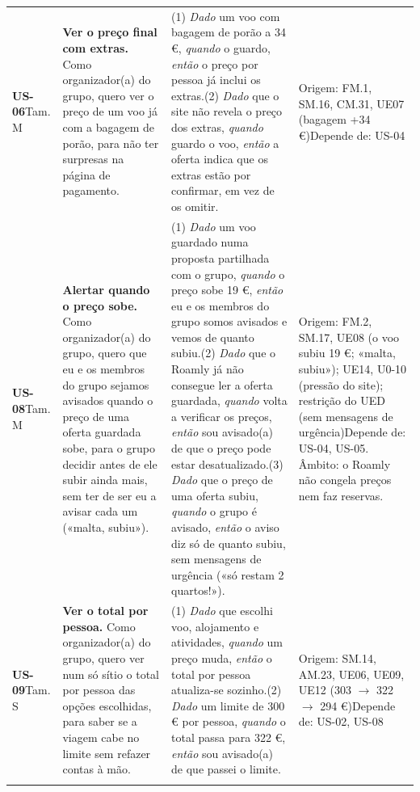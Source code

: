 {\begin{longtable}{@{}p{1.5cm}p{5.1cm}p{5.2cm}p{3.6cm}@{}}
\textbf{US-06}\newline Tam. M & \textbf{Ver o preço final com extras.} Como organizador(a) do grupo, quero ver o preço de um voo já com a bagagem de porão, para não ter surpresas na página de pagamento. & (1) \textit{Dado} um voo com bagagem de porão a 34 €, \textit{quando} o guardo, \textit{então} o preço por pessoa já inclui os extras.\newline (2) \textit{Dado} que o site não revela o preço dos extras, \textit{quando} guardo o voo, \textit{então} a oferta indica que os extras estão por confirmar, em vez de os omitir. & Origem: FM.1, SM.16, CM.31, UE07 (bagagem +34 €)\newline Depende de: US-04 \\ \addlinespace
\textbf{US-08}\newline Tam. M & \textbf{Alertar quando o preço sobe.} Como organizador(a) do grupo, quero que eu e os membros do grupo sejamos avisados quando o preço de uma oferta guardada sobe, para o grupo decidir antes de ele subir ainda mais, sem ter de ser eu a avisar cada um («malta, subiu»). & (1) \textit{Dado} um voo guardado numa proposta partilhada com o grupo, \textit{quando} o preço sobe 19 €, \textit{então} eu e os membros do grupo somos avisados e vemos de quanto subiu.\newline (2) \textit{Dado} que o Roamly já não consegue ler a oferta guardada, \textit{quando} volta a verificar os preços, \textit{então} sou avisado(a) de que o preço pode estar desatualizado.\newline (3) \textit{Dado} que o preço de uma oferta subiu, \textit{quando} o grupo é avisado, \textit{então} o aviso diz só de quanto subiu, sem mensagens de urgência («só restam 2 quartos!»). & Origem: FM.2, SM.17, UE08 (o voo subiu 19 €; «malta, subiu»); UE14, U0-10 (pressão do site); restrição do UED (sem mensagens de urgência)\newline Depende de: US-04, US-05. Âmbito: o Roamly não congela preços nem faz reservas. \\ \addlinespace
\textbf{US-09}\newline Tam. S & \textbf{Ver o total por pessoa.} Como organizador(a) do grupo, quero ver num só sítio o total por pessoa das opções escolhidas, para saber se a viagem cabe no limite sem refazer contas à mão. & (1) \textit{Dado} que escolhi voo, alojamento e atividades, \textit{quando} um preço muda, \textit{então} o total por pessoa atualiza-se sozinho.\newline (2) \textit{Dado} um limite de 300 € por pessoa, \textit{quando} o total passa para 322 €, \textit{então} sou avisado(a) de que passei o limite. & Origem: SM.14, AM.23, UE06, UE09, UE12 (303 $\rightarrow$ 322 $\rightarrow$ 294 €)\newline Depende de: US-02, US-08 \\ \addlinespace

\end{longtable}}
